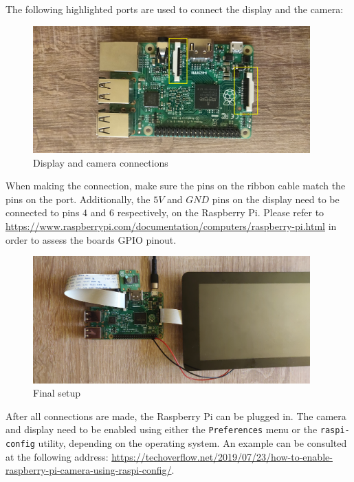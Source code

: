 The following highlighted ports are used to connect the display and the camera:

\begin{figure}[H]
	\includegraphics[width=0.95\textwidth, height=0.45\textwidth]{resources/Manual_Connections.jpg}
	\caption{Display and camera connections}
\end{figure}

When making the connection, make sure the pins on the ribbon cable match the pins on the port. Additionally,
the \(5V\) and \(GND\) pins on the display need to be connected to pins \(4\) and \(6\) respectively, on the Raspberry Pi.
Please refer to \url{https://www.raspberrypi.com/documentation/computers/raspberry-pi.html} in order to assess
the boards GPIO pinout.

\begin{figure}[H]
	\includegraphics[width=0.95\textwidth, height=0.45\textwidth]{resources/Manual_Setup.jpg}
	\caption{Final setup}
\end{figure}

After all connections are made, the Raspberry Pi can be plugged in. The camera and display need to be enabled
using either the \verb|Preferences| menu or the \verb|raspi-config| utility, depending on the operating system.
An example can be consulted at the following address:
\url{https://techoverflow.net/2019/07/23/how-to-enable-raspberry-pi-camera-using-raspi-config/}.

